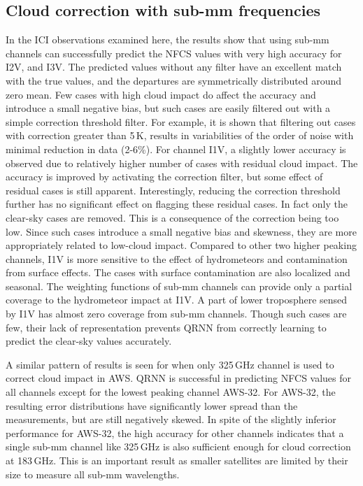 \documentclass[amt, manuscript]{copernicus}
\begin{document}
\subsection{Cloud correction with sub-mm frequencies }
%
In the ICI observations examined here, the results show that using sub-mm channels can successfully predict the NFCS values with very high accuracy for I2V, and I3V. The predicted values without any filter have an excellent match with the true values, and the departures are symmetrically distributed around zero mean. Few cases with high cloud impact do affect the accuracy and introduce a small negative bias, but such cases are easily filtered out with a simple correction threshold filter. For example, it is shown that filtering out cases with correction greater than 5\,K, results in variabilities of the order of noise with minimal reduction in data (2-6\%). For channel I1V, a slightly lower accuracy is observed due to relatively higher number of cases with residual cloud impact. The accuracy is improved by activating the correction filter, but some effect of residual cases is still apparent. Interestingly, reducing the correction threshold further has no significant effect on flagging these residual cases. In fact only the clear-sky cases are removed. This is a consequence of the correction being too low. Since such cases introduce a small negative bias and skewness, they are more appropriately related to low-cloud impact. Compared to other two higher peaking channels, I1V is more sensitive to the effect of hydrometeors  and contamination from surface effects. The cases with surface contamination are also localized and seasonal. The weighting functions of sub-mm channels can provide only a partial coverage to the hydrometeor impact at I1V. A part of lower troposphere sensed by I1V has almost zero coverage from sub-mm channels. Though such cases are few, their lack of representation prevents QRNN from correctly learning to predict the clear-sky values accurately.

A similar pattern of results is seen for when only 325\,GHz channel is used to correct cloud impact in AWS. QRNN is successful in predicting NFCS values for all channels except for the lowest peaking channel AWS-32. For AWS-32, the resulting error distributions have significantly lower spread than the measurements, but are still negatively skewed. In spite of the slightly inferior performance for AWS-32, the high accuracy for other channels indicates that a single sub-mm channel like 325\,GHz is also sufficient enough for cloud correction at 183\,GHz. This is an important result as smaller satellites are limited by their size to measure all sub-mm wavelengths.
\end{document}
